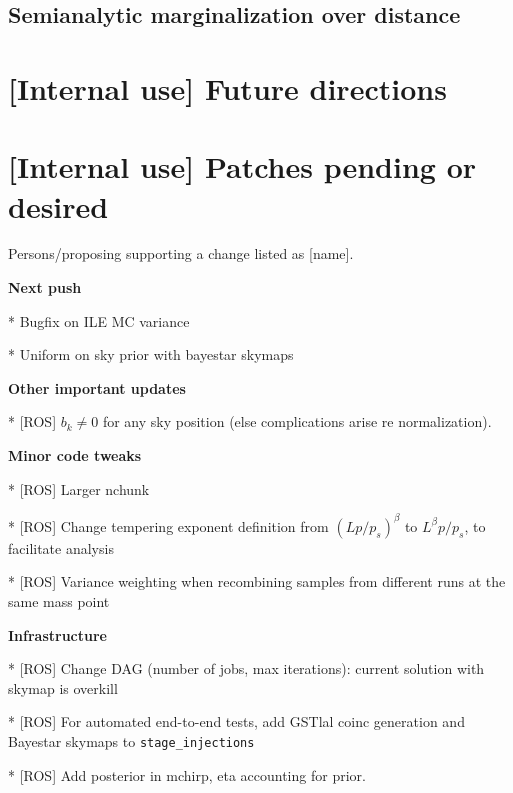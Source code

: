 \documentclass[twocolumn,prd,nofootinbib]{revtex4}
\newcommand\BS{{\sc Bayestar}}
\newcommand\gstlal{{\sc GSTlal}}
\begin{document}
{\subsection{Semianalytic marginalization over distance}


\section{[Internal use] Future directions}

\section{[Internal use] Patches pending or desired}

Persons/proposing supporting  a change listed as [name].

\noindent \textbf{Next push}

* Bugfix on ILE MC variance

* Uniform on sky prior with bayestar skymaps

\noindent \textbf{Other important updates}

*  [ROS]  $b_k \ne 0$ for any sky position (else complications arise re normalization).


\noindent \textbf{Minor code tweaks}

* [ROS] Larger nchunk

* [ROS] Change tempering exponent definition from $(Lp/p_s)^\beta$ to $L^\beta p/p_s$, to facilitate analysis

* [ROS] Variance weighting when recombining samples from different runs at the same mass point


\noindent \textbf{Infrastructure}

* [ROS] Change DAG (number of jobs, max iterations): current solution with skymap is overkill


* [ROS] For automated end-to-end tests, add \gstlal{} coinc generation and \BS{} skymaps to \texttt{stage\_injections}

* [ROS] Add posterior in mchirp, eta accounting for prior.
}

\end{document}
